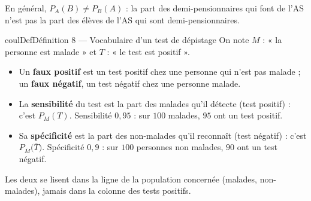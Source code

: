 \documentclass[11pt,a4paper]{article}
\makeatletter
\newcounter{lycee@signet}
\newcommand{\signet}[3][]{\stepcounter{lycee@signet}%
  \edef\lycee@dest{\if\relax\detokenize{#1}\relax
    signet.\arabic{lycee@signet}\else#1\fi}%
  \hypertarget{\lycee@dest}{}\bookmark[level=#2,dest=\lycee@dest]{#3}}
\newenvironment{definitionbox}[1][Définition]%
  {\begin{boitecours}[phantom={\signet{2}{#1}}]{coulDef}{#1}}{\end{boitecours}}
\makeatother
\begin{document}
\begin{remarquebox}
En général, $P_A(B)\ne P_B(A)$ : la part des demi-pensionnaires qui font de l'AS
n'est pas la part des élèves de l'AS qui sont demi-pensionnaires.
\end{remarquebox}

\begin{definitionbox}[Définition 8 --- Vocabulaire d'un test de dépistage]
On note $M$ : « la personne est malade » et $T$ : « le test est positif ».
\begin{itemize}
  \item Un \textbf{faux positif} est un test positif chez une personne qui n'est pas
    malade ; un \textbf{faux négatif}, un test négatif chez une personne malade.
  \item La \textbf{sensibilité} du test est la part des malades qu'il détecte (test
    positif) : c'est $P_M(T)$. Sensibilité $0{,}95$ : sur $100$ malades, $95$ ont un
    test positif.
  \item Sa \textbf{spécificité} est la part des non-malades qu'il reconnaît (test
    négatif) : c'est $P_{\overline{M}}\big(\overline{T}\big)$. Spécificité $0{,}9$ :
    sur $100$ personnes non malades, $90$ ont un test négatif.
\end{itemize}
Les deux se lisent dans la ligne de la population concernée (malades, non-malades),
jamais dans la colonne des tests positifs.
\end{definitionbox}
\end{document}

